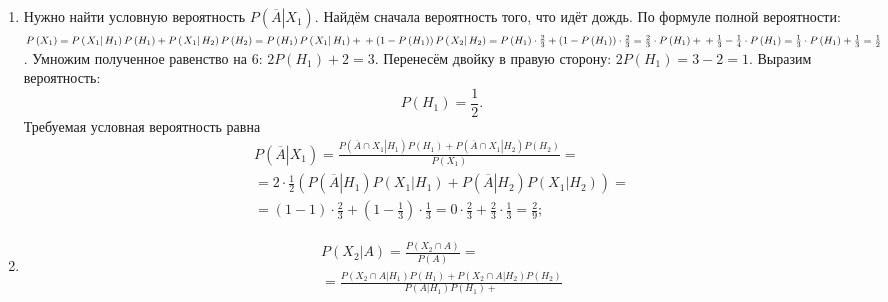 \begin{enumerate}[label=\alph*)]
\item Нужно найти условную вероятность $P \left( \left. \overline{A} \right| X_1 \right) $.
Найдём сначала вероятность того, что идёт дождь.
По формуле полной вероятности:
$P \left( X_1 \right) =
P \left( \left. X_1 \right| H_1 \right) P \left( H_1 \right) + P \left( \left. X_1 \right| H_2 \right) P \left( H_2 \right) =
P \left( H_1 \right) P \left( \left. X_1 \right| H_1 \right) +  \\
+ \left( 1 - P \left( H_1 \right) \right) P \left( \left. X_2 \right| H_2 \right) =
P \left( H_1 \right) \cdot \frac{2}{3} + \left( 1 - P \left( H_1 \right) \right) \cdot \frac{2}{3} =
\frac{2}{3} \cdot P \left( H_1 \right) + \\
+ \frac{1}{3} - \frac{1}{4} \cdot P \left( H_1 \right) =
\frac{1}{3} \cdot P \left( H_1 \right) + \frac{1}{3} =
\frac{1}{2}$.
Умножим полученное равенство на 6: $2P \left( H_1 \right) + 2 = 3$.
Перенесём двойку в правую сторону: $2P \left( H_1 \right) = 3 - 2 = 1$.
Выразим вероятность:
$$P \left( H_1 \right) =
\frac{1}{2}.$$
Требуемая условная вероятность равна
\begin{equation*}
\begin{split}
P \left( \left. \overline{A} \right| X_1 \right) =
\frac{P \left( \left. \overline{A} \cap X_1 \right| H_1 \right) P \left( H_1 \right) +
P \left( \left. \overline{A} \cap X_1 \right| H_2 \right) P \left( H_2 \right) }{P \left( X_1 \right) } = \\
= 2 \cdot \frac{1}{2} \left( P \left( \left. \overline{A} \right| H_1 \right) P \left( \left. X_1 \right| H_1 \right) +
P \left( \left. \overline{A} \right| H_2 \right) P \left( \left. X_1 \right| H_2 \right) \right) = \\
= \left( 1-1 \right) \cdot \frac{2}{3} + \left( 1 - \frac{1}{3} \right) \cdot \frac{1}{3} =
0 \cdot \frac{2}{3} + \frac{2}{3} \cdot \frac{1}{3} =
\frac{2}{9};
\end{split}
\end{equation*}
\item 
\begin{equation*}
\begin{split}
P \left( \left. X_2 \right| A \right) =
\frac{P \left( X_2 \cap A \right) }{P \left( A \right) } = \\
= \frac{P \left( \left. X_2 \cap A \right| H_1 \right) P \left( H_1 \right) +
P \left( \left. X_2 \cap A \right| H_2 \right) P \left( H_2 \right) }{P \left( \left. A \right| H_1 \right) P \left( H_1 \right) +
}
\end{split}
\end{equation*}
\end{enumerate}

